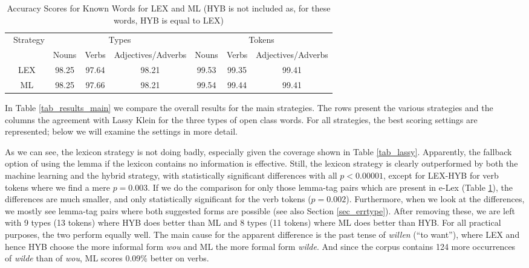 \documentclass[a4paper,10pt,twoside]{article}
\begin{document}
\begin{table}[tbh]
\begin{center}
\begin{tabular}{|c|ccc|ccc|}
\hline
 Strategy & \multicolumn{3}{|c|}{Types} & \multicolumn{3}{|c|}{Tokens} \\ 
& Nouns & Verbs & Adjectives/Adverbs & Nouns & Verbs & Adjectives/Adverbs \\ 
\hline
LEX & 98.25 & 97.64 & 98.21 & 99.53 & 99.35 & 99.41  \\
ML  & 98.25 & 97.66 & 98.21 & 99.54 & 99.44 & 99.41 \\

\hline
\end{tabular}
\caption{Accuracy Scores for Known Words for LEX and ML (HYB is not included as, for these words, HYB is equal to LEX)}
\label{tab_results_main_known}
\end{center}
\end{table}

In Table \ref{tab_results_main} we compare the overall results for the main strategies. The rows present the various strategies and the columns the agreement with Lassy Klein for the three types of open class words. For all strategies, the best scoring settings are represented; below we will examine the settings in more detail.

As we can see, the lexicon strategy is not doing badly, especially given the coverage shown in Table \ref{tab_lassy}. Apparently, the fallback option of using the lemma if the lexicon contains no information is effective. Still, the lexicon strategy is clearly outperformed by both the machine learning and the hybrid strategy, with statistically significant differences with all $p<0.00001$, except for LEX-HYB for verb tokens where we find a mere $p=0.003$. If we do the comparison for only those lemma-tag pairs which are present in e-Lex (Table \ref{tab_results_main_known}), the differences are much smaller, and only statistically significant for the verb tokens ($p=0.002$). Furthermore, when we look at the differences, we mostly see lemma-tag pairs where both suggested forms are possible (see also Section \ref{sec_errtype}). After removing these, we are left with 9 types (13 tokens) where HYB does better than ML and 8 types (11 tokens) where ML does better than HYB. For all practical purposes, the two perform equally well. The main cause for the apparent difference is the past tense of \textit{willen} (``to want''), where LEX and hence HYB choose the more informal form \textit{wou} and ML the more formal form \textit{wilde}. And since the corpus contains 124 more occurrences of \textit{wilde} than of \textit{wou}, ML scores 0.09\% better on verbs. 
\end{document}
